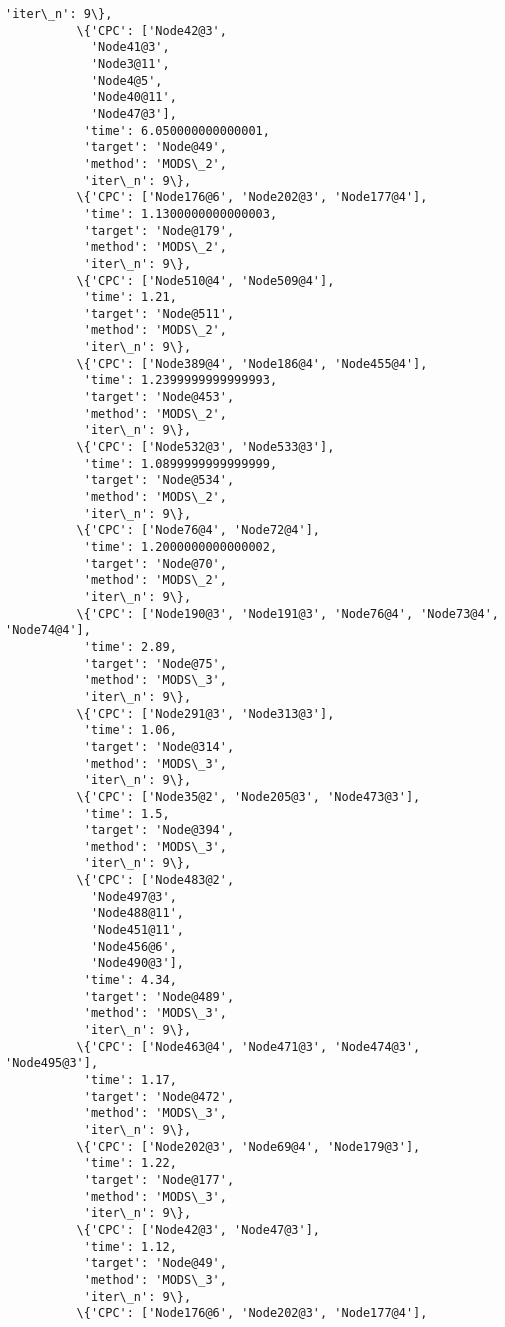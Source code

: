 \documentclass[11pt]{article}
\begin{document}
\begin{Verbatim}[commandchars=\\\{\}]
           'iter\_n': 9\},
          \{'CPC': ['Node42@3',
            'Node41@3',
            'Node3@11',
            'Node4@5',
            'Node40@11',
            'Node47@3'],
           'time': 6.050000000000001,
           'target': 'Node@49',
           'method': 'MODS\_2',
           'iter\_n': 9\},
          \{'CPC': ['Node176@6', 'Node202@3', 'Node177@4'],
           'time': 1.1300000000000003,
           'target': 'Node@179',
           'method': 'MODS\_2',
           'iter\_n': 9\},
          \{'CPC': ['Node510@4', 'Node509@4'],
           'time': 1.21,
           'target': 'Node@511',
           'method': 'MODS\_2',
           'iter\_n': 9\},
          \{'CPC': ['Node389@4', 'Node186@4', 'Node455@4'],
           'time': 1.2399999999999993,
           'target': 'Node@453',
           'method': 'MODS\_2',
           'iter\_n': 9\},
          \{'CPC': ['Node532@3', 'Node533@3'],
           'time': 1.0899999999999999,
           'target': 'Node@534',
           'method': 'MODS\_2',
           'iter\_n': 9\},
          \{'CPC': ['Node76@4', 'Node72@4'],
           'time': 1.2000000000000002,
           'target': 'Node@70',
           'method': 'MODS\_2',
           'iter\_n': 9\},
          \{'CPC': ['Node190@3', 'Node191@3', 'Node76@4', 'Node73@4', 'Node74@4'],
           'time': 2.89,
           'target': 'Node@75',
           'method': 'MODS\_3',
           'iter\_n': 9\},
          \{'CPC': ['Node291@3', 'Node313@3'],
           'time': 1.06,
           'target': 'Node@314',
           'method': 'MODS\_3',
           'iter\_n': 9\},
          \{'CPC': ['Node35@2', 'Node205@3', 'Node473@3'],
           'time': 1.5,
           'target': 'Node@394',
           'method': 'MODS\_3',
           'iter\_n': 9\},
          \{'CPC': ['Node483@2',
            'Node497@3',
            'Node488@11',
            'Node451@11',
            'Node456@6',
            'Node490@3'],
           'time': 4.34,
           'target': 'Node@489',
           'method': 'MODS\_3',
           'iter\_n': 9\},
          \{'CPC': ['Node463@4', 'Node471@3', 'Node474@3', 'Node495@3'],
           'time': 1.17,
           'target': 'Node@472',
           'method': 'MODS\_3',
           'iter\_n': 9\},
          \{'CPC': ['Node202@3', 'Node69@4', 'Node179@3'],
           'time': 1.22,
           'target': 'Node@177',
           'method': 'MODS\_3',
           'iter\_n': 9\},
          \{'CPC': ['Node42@3', 'Node47@3'],
           'time': 1.12,
           'target': 'Node@49',
           'method': 'MODS\_3',
           'iter\_n': 9\},
          \{'CPC': ['Node176@6', 'Node202@3', 'Node177@4'],

\end{Verbatim}
\end{document}
